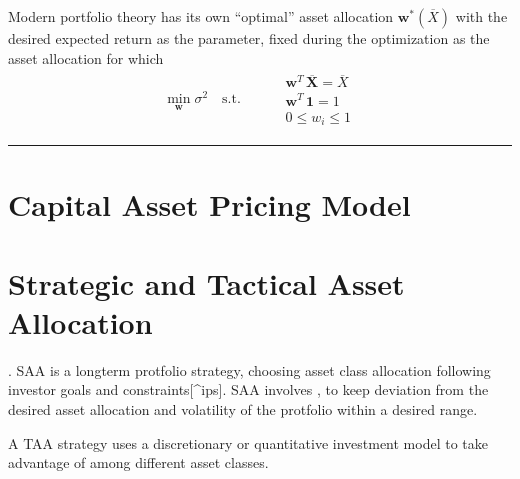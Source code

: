 \documentclass[letterpaper,10pt,english]{jupyterBook}
\begin{document}
\sphinxAtStartPar
Modern portfolio theory has its own “optimal” asset allocation \(\mathbf{w}^*\left(\overline{X}\right)\) \sphinxhyphen{} with the desired expected return as the parameter, fixed during the optimization \sphinxhyphen{} as the asset allocation for which
\begin{equation*}
\begin{split}
  \min_{\mathbf{w}} \sigma^2 \quad \text{s.t.}
\begin{aligned}
  & \qquad \mathbf{w}^T \, \overline{\mathbf{X}} = \overline{X} \\
  & \qquad \mathbf{w}^T \, \mathbf{1} = 1 \\
  & \qquad 0 \le w_i \le 1
\end{aligned}\end{split}
\end{equation*}

\bigskip\hrule\bigskip


\sphinxstepscope


\chapter{Capital Asset Pricing Model}
\label{\detokenize{ch/investing/capm:capital-asset-pricing-model}}\label{\detokenize{ch/investing/capm:fin-edu-investing-capm}}\label{\detokenize{ch/investing/capm::doc}}
\sphinxstepscope


\chapter{Strategic and Tactical Asset Allocation}
\label{\detokenize{ch/investing/strategic-tactical:strategic-and-tactical-asset-allocation}}\label{\detokenize{ch/investing/strategic-tactical:fin-edu-investing-trategic-tactical}}\label{\detokenize{ch/investing/strategic-tactical::doc}}
\sphinxAtStartPar
{}. SAA is a long\sphinxhyphen{}term protfolio strategy, choosing asset class allocation following investor goals and constraints{[}\textasciicircum{}ips{]}. SAA involves , to keep deviation from the desired asset allocation and volatility of the protfolio within a desired range.



\sphinxAtStartPar
{} A TAA strategy uses a discretionary or quantitative investment model to take advantage of  among different asset classes. 
\end{document}

